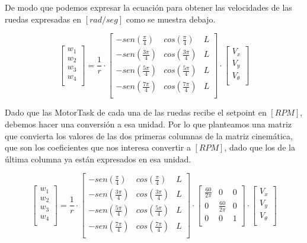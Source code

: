 De modo que podemos expresar la ecuación para obtener las velocidades de las ruedas expresadas en $[rad/seg]$ como se muestra debajo.

$$ \begin{bmatrix} w_1 \\ w_2 \\ w_3 \\ w_4 \\ \end{bmatrix} = \frac{1}{r} \cdot \begin{bmatrix}
    {-sen(\frac{\pi}{4})} & {cos( \frac{\pi}{4})} & L \\
    {-sen(\frac{3\pi}{4})} & {cos(\frac{3\pi}{4})} & L \\
    {-sen(\frac{5\pi}{4})} & {cos(\frac{5\pi}{4})} & L \\
    {-sen(\frac{7\pi}{4})} & {cos(\frac{7\pi}{4})} & L \\
\end{bmatrix} \cdot
\begin{bmatrix} V_x \\ V_y \\ V_\theta \\ \end{bmatrix} $$

Dado que las MotorTask de cada una de las ruedas recibe el setpoint en $[RPM]$, debemos hacer una conversión a esa unidad. Por lo que planteamos una matriz que convierta los valores de las dos primeras columnas de la matriz cinemática, que son los coeficientes que nos interesa convertir a $[RPM]$, dado que los de la última columna ya están expresados en esa unidad.

$$ \begin{bmatrix} w_1 \\ w_2 \\ w_3 \\ w_4 \\ \end{bmatrix} =
    \frac{1}{r}
    \cdot
    \begin{bmatrix}
        {-sen(\frac{\pi}{4})} & {cos( \frac{\pi}{4})} & L \\
        {-sen(\frac{3\pi}{4})} & {cos(\frac{3\pi}{4})} & L \\
        {-sen(\frac{5\pi}{4})} & {cos(\frac{5\pi}{4})} & L \\
        {-sen(\frac{7\pi}{4})} & {cos(\frac{7\pi}{4})} & L \\
    \end{bmatrix}
    \cdot
    \begin{bmatrix}
        {\frac{60}{2 \pi}} & {0} & {0} \\
        {0} & {\frac{60}{2 \pi}} & {0} \\
        {0} & {0} & {1}                \\
    \end{bmatrix}
    \cdot
    \begin{bmatrix} V_x \\ V_y \\ V_\theta \\ \end{bmatrix} $$


